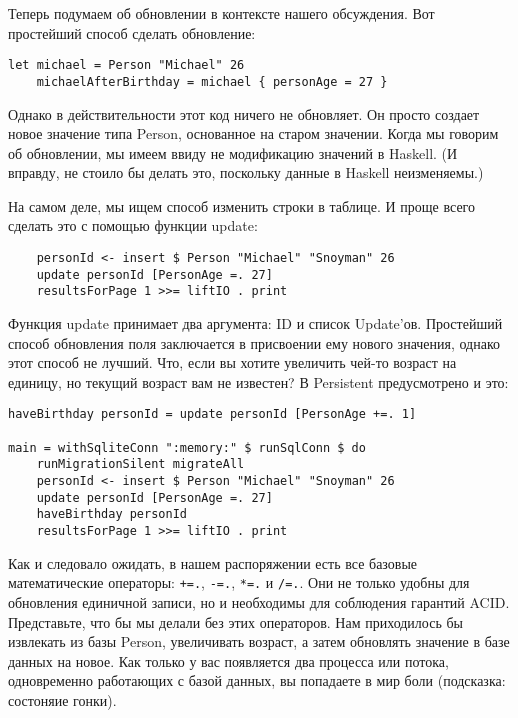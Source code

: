 Теперь подумаем об обновлении в контексте нашего обсуждения. Вот простейший способ сделать обновление:

\begin{lstlisting}
let michael = Person "Michael" 26
    michaelAfterBirthday = michael { personAge = 27 }
\end{lstlisting}

Однако в действительности этот код ничего не обновляет. Он просто создает новое значение типа Person, основанное на старом значении. Когда мы говорим об обновлении, мы имеем ввиду не модификацию значений в Haskell. (И вправду, не стоило бы делать это, поскольку данные в Haskell неизменяемы.) %

На самом деле, мы ищем способ изменить строки в таблице. И проще всего сделать это с помощью функции update:

\begin{lstlisting}
    personId <- insert $ Person "Michael" "Snoyman" 26
    update personId [PersonAge =. 27]
    resultsForPage 1 >>= liftIO . print
\end{lstlisting}%

Функция update принимает два аргумента: ID и список Update'ов. Простейший способ обновления поля заключается в присвоении ему нового значения, однако этот способ не лучший. Что, если вы хотите увеличить чей-то возраст на единицу, но текущий возраст вам не известен? В Persistent предусмотрено и это:

\begin{lstlisting}
haveBirthday personId = update personId [PersonAge +=. 1]

main = withSqliteConn ":memory:" $ runSqlConn $ do
    runMigrationSilent migrateAll
    personId <- insert $ Person "Michael" "Snoyman" 26
    update personId [PersonAge =. 27]
    haveBirthday personId
    resultsForPage 1 >>= liftIO . print
\end{lstlisting}%

Как и следовало ожидать, в нашем распоряжении есть все базовые математические операторы: \lstinline'+=.', \lstinline'-=.', \lstinline'*=.' и \lstinline'/=.'. Они не только удобны для обновления единичной записи, но и необходимы для соблюдения гарантий ACID. Представьте, что бы мы делали без этих операторов. Нам приходилось бы извлекать из базы Person, увеличивать возраст, а затем обновлять значение в базе данных на новое. Как только у вас появляется два процесса или потока, одновременно работающих с базой данных, вы попадаете в мир боли (подсказка: состоняие гонки).

